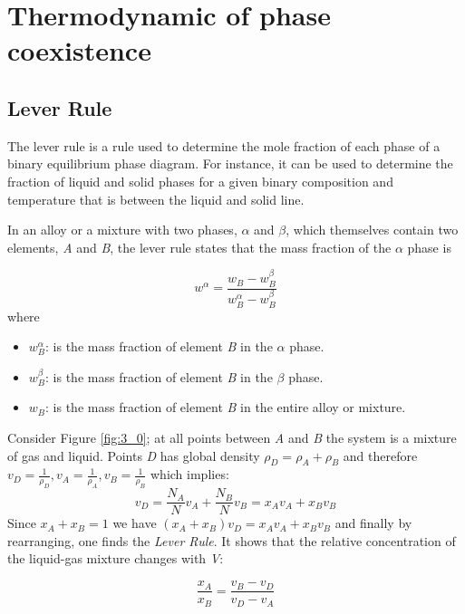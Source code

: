 \documentclass[../main/main.tex]{subfiles}
\begin{document}
\section{Thermodynamic of phase coexistence}

\subsection{Lever Rule}


The lever rule \cite{3_lesson_1} is a rule used to determine the mole fraction of each phase of a binary equilibrium phase diagram. For instance, it can be used to determine the fraction of liquid and solid phases for a given binary composition and temperature that is between the liquid and solid line.

In an alloy or a mixture with two phases, \( \alpha  \)  and \( \beta  \), which themselves contain two elements, \emph{A}  and \emph{B}, the lever rule states that the mass fraction of the \( \alpha  \)  phase is

\begin{equation}
w^{\alpha } = \frac{w_B - w_B^\beta }{w_B^\alpha - w_B^\beta }
\end{equation}
where
\begin{itemize}
\item \( w_B^\alpha  \):  is the mass fraction of element \emph{B}  in the \( \alpha  \) phase.
\item \( w_B^\beta   \):  is the mass fraction of element \emph{B} in the \( \beta  \)  phase.
\item \( w_B  \):  is the mass fraction of element \emph{B} in the entire alloy or mixture.
\end{itemize}

\begin{example}{}{}
  Consider Figure \ref{fig:3_0}; at all points between \emph{A} and \emph{B} the system is a mixture of gas and liquid. Points \emph{D} has global density \( \rho_D = \rho_A + \rho_B \)  and therefore \( v_D = \frac{1}{\rho_D}, v_A = \frac{1}{\rho _A}, v_B = \frac{1}{\rho_B} \) which implies:
  \begin{equation*}
    v_D = \frac{N_A}{N} v_A + \frac{N_B}{N} v_B = x_A v_A + x_B v_B
    \label{eq:}
  \end{equation*}
  Since \( x_A + x_B = 1 \) we have \( (x_A + x_B)v_D = x_A v_A + x_B v_B \) and finally by rearranging, one finds the \textit{Lever Rule}. It shows that the relative concentration of the liquid-gas mixture changes with \emph{V}:

  \begin{equation*}
    \frac{x_A}{x_B} = \frac{v_B - v_D}{v_D - v_A}
    \label{eq:}
  \end{equation*}
  
\end{example}
\end{document}

